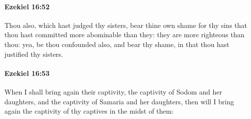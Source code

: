 		\paragraph{Ezekiel 16:52} %
			\label{EZEKIEL-16-52}

			Thou also, which hast judged thy sisters, bear thine own shame for thy sins that thou hast committed more abominable than they: they are more righteous than thou: yea, be thou confounded also, and bear thy shame, in that thou hast justified thy sisters.


		\paragraph{Ezekiel 16:53} %
			\label{EZEKIEL-16-53}

			When I shall bring again their captivity, the captivity of Sodom and her daughters, and the captivity of Samaria and her daughters, then will I bring again the captivity of thy captives in the midst of them:

